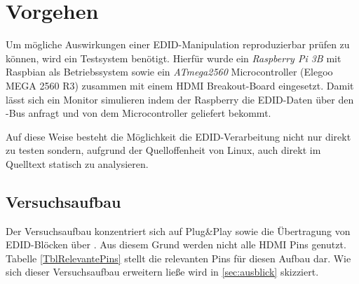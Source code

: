 
\section{Vorgehen}
Um mögliche Auswirkungen einer EDID-Manipulation reproduzierbar prüfen zu können, wird ein Testsystem benötigt. Hierfür wurde ein \emph{Raspberry Pi 3B} mit Raspbian als Betriebssystem sowie ein \emph{ATmega2560} Microcontroller (Elegoo MEGA 2560 R3) zusammen mit einem HDMI Breakout-Board eingesetzt. Damit lässt sich ein Monitor simulieren indem der Raspberry die EDID-Daten über den \interintegratedbus-Bus anfragt und von dem Microcontroller geliefert bekommt. 

Auf diese Weise besteht die Möglichkeit die EDID-Verarbeitung nicht nur direkt zu testen sondern, aufgrund der Quelloffenheit von Linux, auch direkt im Quelltext statisch zu analysieren.

\subsection{Versuchsaufbau}
Der Versuchsaufbau konzentriert sich auf Plug\&Play sowie die Übertragung von EDID-Blöcken über \interintegratedbus. 
Aus diesem Grund werden nicht alle HDMI Pins genutzt. Tabelle \ref{TblRelevantePins} stellt die relevanten Pins für diesen Aufbau dar. 
Wie sich dieser Versuchsaufbau erweitern ließe wird in \cref{sec:ausblick} skizziert.


\hspace*{-4cm}
\begin{table}[H]
	\caption{Genutzte Pins des HDMI Ports}
	\def\arraystretch{1.5}
	\centering
	\small
	\setlength\tabcolsep{1pt}
	\label{TblRelevantePins}
\end{table}

